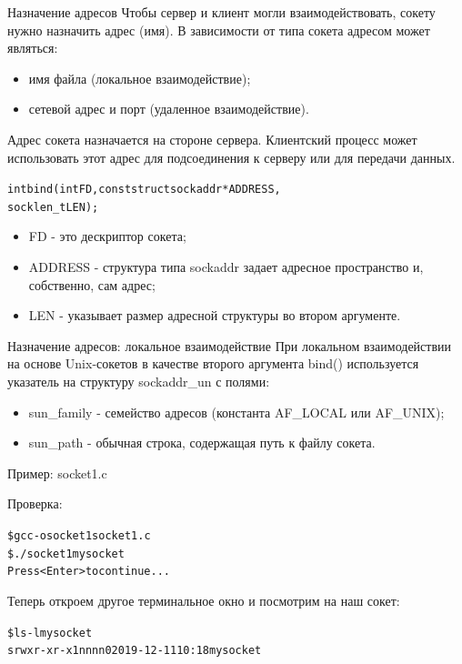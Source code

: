 \documentclass{beamer}
\begin{document}
\begin{frame}[fragile]{Назначение адресов}
	Чтобы сервер и клиент могли взаимодействовать, сокету нужно назначить адрес (имя). 
	В зависимости от типа сокета адресом может являться:
	\begin{itemize}
		\item имя файла (локальное взаимодействие);
		\item сетевой адрес и порт (удаленное взаимодействие).
	\end{itemize}
	Адрес сокета назначается на стороне сервера. 
	Клиентский процесс может использовать этот адрес для подсоединения к серверу или для передачи данных.
	\begin{alltt}
		int bind (int FD, const struct sockaddr * ADDRESS, 
		          socklen_t LEN);
	\end{alltt}
	\begin{itemize}
		\item FD - это дескриптор сокета;
		\item ADDRESS - структура типа sockaddr задает адресное пространство и, собственно, сам адрес;
		\item LEN - указывает размер адресной структуры во втором аргументе.		
	\end{itemize}
\end{frame}

\begin{frame}[fragile]{Назначение адресов: локальное взаимодействие}
	При локальном взаимодействии на основе Unix-сокетов в качестве второго аргумента bind() используется указатель на структуру sockaddr\_un с полями: 
	\begin{itemize}
		\item sun\_family - семейство адресов (константа AF\_LOCAL или AF\_UNIX);
		\item sun\_path - обычная строка, содержащая путь к файлу сокета.
	\end{itemize}
	Пример: socket1.c
	
	Проверка:
	\begin{alltt}
		\$ gcc -o socket1 socket1.c
		\$ ./socket1 mysocket
		Press <Enter> to continue...
	\end{alltt}
	Теперь откроем другое терминальное окно и посмотрим на наш сокет:
	\begin{alltt}
		\$ ls -l mysocket
		srwxr-xr-x 1 nn nn 0 2019-12-11 10:18 mysocket
	\end{alltt}
\end{frame}
\end{document}
